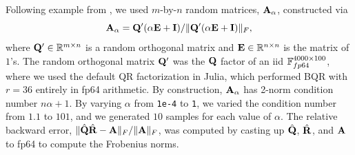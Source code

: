%
Following example from \cite{Mori2012}, we used $m$-by-$n$ random matrices, $\mathbf{A}_{\alpha}$, constructed via
\begin{equation}
\bb{A}_{\alpha} = \bb{Q'}(\alpha \bb{E} + \bb{I})/\|\bb{Q'}(\alpha \bb{E} + \bb{I})\|_F,
\label{eqn:genRM}
\end{equation}
where $\mathbf{Q'}\in\mathbb{R}^{m\times n}$ is a random orthogonal matrix and $\mathbf{E}\in\mathbb{R}^{n\times n}$ is the matrix of $1$'s. 
The random orthogonal matrix $\mathbf{Q'}$ was the $\mathbf{Q}$ factor of an iid $\mathbb{F}_{fp64}^{4000\times100}$, where we used the default QR factorization in Julia, which performed BQR with $r=36$ entirely in fp64 arithmetic. 
By construction, $\mathbf{A}_{\alpha}$ has 2-norm condition number $n\alpha+1$. 
By varying $\alpha$ from {\tt 1e-4} to {\tt 1}, we varied the condition number from $1.1$ to $101$, and we generated $10$ samples for each value of $\alpha$.
The relative backward error, $\|\hat{\mathbf{Q}}\hat{\mathbf{R}}-\mathbf{A}\|_F/\|\mathbf{A}\|_F$, was computed by casting up $\hat{\mathbf{Q}}$, $\hat{\mathbf{R}}$, and $\mathbf{A}$ to fp64 to compute the Frobenius norms.

